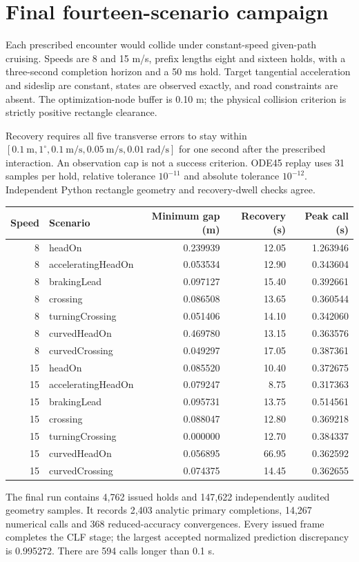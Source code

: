 \documentclass[11pt]{article}
\begin{document}
\section{Final fourteen-scenario campaign}
Each prescribed encounter would collide under constant-speed given-path
cruising. Speeds are 8 and 15 m/s, prefix lengths eight and sixteen holds,
with a three-second completion horizon and a 50 ms hold. Target tangential
acceleration and sideslip are constant, states are observed exactly, and road
constraints are absent. The optimization-node buffer is 0.10 m; the physical
collision criterion is strictly positive rectangle clearance.

Recovery requires all five transverse errors to stay within
$[0.1\ \mathrm m,1^\circ,0.1\ \mathrm{m/s},0.05\ \mathrm{m/s},
0.01\ \mathrm{rad/s}]$ for one second after the prescribed interaction.
An observation cap is not a success criterion. ODE45 replay uses 31 samples
per hold, relative tolerance $10^{-11}$ and absolute tolerance $10^{-12}$.
Independent Python rectangle geometry and recovery-dwell checks agree.

\begin{center}\small\begin{tabular}{rlrrr}\toprule
Speed & Scenario & Minimum gap (m) & Recovery (s) & Peak call (s)\\\midrule
8 & headOn & 0.239939 & 12.05 & 1.263946\\
8 & acceleratingHeadOn & 0.053534 & 12.90 & 0.343604\\
8 & brakingLead & 0.097127 & 15.40 & 0.392661\\
8 & crossing & 0.086508 & 13.65 & 0.360544\\
8 & turningCrossing & 0.051406 & 14.10 & 0.342060\\
8 & curvedHeadOn & 0.469780 & 13.15 & 0.363576\\
8 & curvedCrossing & 0.049297 & 17.05 & 0.387361\\
15 & headOn & 0.085520 & 10.40 & 0.372675\\
15 & acceleratingHeadOn & 0.079247 & 8.75 & 0.317363\\
15 & brakingLead & 0.095731 & 13.75 & 0.514561\\
15 & crossing & 0.088047 & 12.80 & 0.369218\\
15 & turningCrossing & 0.000000 & 12.70 & 0.384337\\
15 & curvedHeadOn & 0.056895 & 66.95 & 0.362592\\
15 & curvedCrossing & 0.074375 & 14.45 & 0.362655\\
\bottomrule\end{tabular}\end{center}
The final run contains 4,762 issued holds and 147,622 independently audited
geometry samples. It records 2,403 analytic primary completions, 14,267
numerical calls and 368 reduced-accuracy convergences. Every issued frame
completes the CLF stage; the largest accepted normalized prediction discrepancy
is 0.995272. There are 594 calls longer than 0.1 s.
\end{document}
